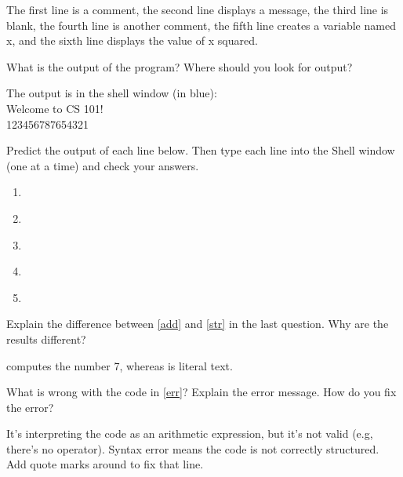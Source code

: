 \begin{answer}[5em]
The first line is a comment, the second line displays a message, the third line is blank, the fourth line is another comment, the fifth line creates a variable named x, and the sixth line displays the value of x squared.
\end{answer}


\Q What is the output of the program? Where should you look for output?

\begin{answer}[5em]
The output is in the shell window (in blue): \\[2pt]
\hspace*{2em} Welcome to CS 101! \\
\hspace*{2em} 123456787654321
\end{answer}


\Q Predict the output of each line below. Then type each line into the Shell window (one at a time) and check your answers.

\begin{enumerate}
\item {} 
\item \label{add}  
\item \label{str}  
\item \label{err}  
\item {} 
\end{enumerate}

\Q Explain the difference between \ref{add} and \ref{str} in the last question. Why are the results different?

\begin{answer}
 computes the number 7, whereas  is literal text.
\end{answer}


\Q What is wrong with the code in \ref{err}? Explain the error message. How do you fix the error?

\begin{answer}
It's interpreting the code  as an arithmetic expression, but it's not valid (e.g, there's no operator). Syntax error means the code is not correctly structured. Add quote marks around  to fix that line.
\end{answer}
